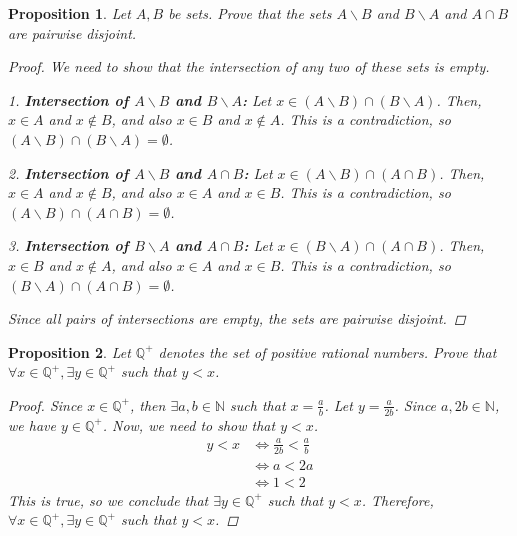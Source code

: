 \documentclass[12pt]{article}
\newcommand{\N}{\mathbb{N}} %
\newcommand{\Q}{\mathbb{Q}} %
\newtheorem{proposition}{Proposition}
\begin{document}
\begin{proposition}
  Let $A, B$ be sets. Prove that the sets $A \backslash B$ and $B \backslash A$ and $A \cap B$ are pairwise disjoint.
  \begin{proof}
    We need to show that the intersection of any two of these sets is empty.

    1. \textbf{Intersection of $A \backslash B$ and $B \backslash A$:}
    Let $x \in (A \backslash B) \cap (B \backslash A)$.
    Then, $x \in A$ and $x \notin B$, and also $x \in B$ and $x \notin A$.
    This is a contradiction, so $(A \backslash B) \cap (B \backslash A) = \emptyset$.

    2. \textbf{Intersection of $A \backslash B$ and $A \cap B$:}
    Let $x \in (A \backslash B) \cap (A \cap B)$.
    Then, $x \in A$ and $x \notin B$, and also $x \in A$ and $x \in B$.
    This is a contradiction, so $(A \backslash B) \cap (A \cap B) = \emptyset$.

    3. \textbf{Intersection of $B \backslash A$ and $A \cap B$:}
    Let $x \in (B \backslash A) \cap (A \cap B)$.
    Then, $x \in B$ and $x \notin A$, and also $x \in A$ and $x \in B$.
    This is a contradiction, so $(B \backslash A) \cap (A \cap B) = \emptyset$.

    Since all pairs of intersections are empty, the sets are pairwise disjoint.
  \end{proof}
\end{proposition}


\begin{proposition}
  Let $\Q^+$ denotes the set of positive rational numbers.
  Prove that $\forall x \in \Q^+, \exists y \in \Q^+$ such that $y < x$.
  \begin{proof}
    Since $x \in \Q^+$, then $\exists a, b \in \N$ such that $x = \frac{a}{b}$.
    Let $y = \frac{a}{2b}$. Since $a, 2b \in \N$, we have $y \in \Q^+$.
    Now, we need to show that $y < x$.
    \begin{align*}
      y < x & \iff \frac{a}{2b} < \frac{a}{b} \\
            & \iff a < 2a                     \\
            & \iff 1 < 2
    \end{align*}
    This is true, so we conclude that $\exists y \in \Q^+$ such that $y < x$.
    Therefore, $\forall x \in \Q^+, \exists y \in \Q^+$ such that $y < x$.
  \end{proof}
\end{proposition}
\end{document}
